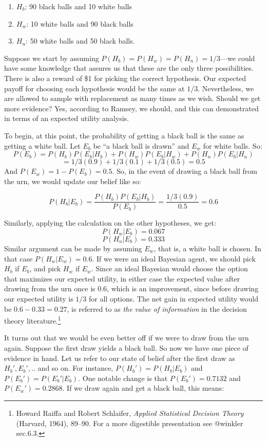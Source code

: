\begin{enumerate}
\def\labelenumi{\arabic{enumi}.}
\tightlist
\item
  \(H_b\): 90 black balls and 10 white balls
\item
  \(H_w\): 10 white balls and 90 black balls
\item
  \(H_n\): 50 white balls and 50 black balls.
\end{enumerate}

Suppose we start by assuming \(P(H_b) = P(H_w) = P(H_n) = 1/3\)---we
could have some knowledge that assures us that these are the only three
possibilities. There is also a reward of \$1 for picking the correct
hypothesis. Our expected payoff for choosing each hypothesis would be
the same at \(1/3\). Nevertheless, we are allowed to sample with
replacement as many times as we wish. Should we get more evidence? Yes,
according to Ramsey, we should, and this can demonstrated in terms of an
expected utility analysis.

To begin, at this point, the probability of getting a black ball is the
same as getting a white ball. Let \(E_b\) be ``a black ball is drawn''
and \(E_w\) for white balls. So:
\[P(E_b) = P(H_b)P(E_b|H_b) + P(H_w)P(E_b|H_w) + P(H_n)P(E_b|H_n)\]
\[=1/3(0.9)+1/3(0.1)+1/3(0.5)=0.5\] And \(P(E_w) = 1 - P(E_b) = 0.5\).
So, in the event of drawing a black ball from the urn, we would update
our belief like so:

\[P(H_b|E_b) = \frac{P(H_b)P(E_b|H_b)}{P(E_b)}=\frac{1/3(0.9)}{0.5} = 0.6 \]

Similarly, applying the calculation on the other hypotheses, we get:
\[P(H_w|E_b) = 0.067\] \[P(H_n|E_b) = 0.333\] Similar argument can be
made by assuming \(E_w\), that is, a white ball is chosen. In that case
\(P(H_w|E_w) = 0.6\). If we were an ideal Bayesian agent, we should pick
\(H_b\) if \(E_b\), and pick \(H_w\) if \(E_w\). Since an ideal Bayesian
would choose the option that maximizes our expected utility, in either
case the expected value after drawing from the urn once is \(0.6\),
which is an improvement, since before drawing our expected utility is
\(1/3\) for all options. The net gain in expected utility would be
\(0.6 - 0.33 = 0.27\), is referred to as \emph{the value of information}
in the decision theory literature.\footnote{Howard Raiffa and Robert
  Schlaifer, \emph{Applied Statistical Decision Theory} (Harvard, 1964),
  89--90. For a more digestible presentation see @winkler sec.6.3.}

It turns out that we would be even better off if we were to draw from
the urn again. Suppose the first draw yields a black ball. So now we
have one piece of evidence in hand. Let us refer to our state of belief
after the first draw as \(H_b', E_b',..\) and so on. For instance,
\(P(H_b') = P(H_b|E_b)\) and \(P(E_b') = P(E_b'|E_b)\). One notable
change is that \(P(E_b') = 0.7132\) and \(P(E_w')=0.2868\). If we draw
again and get a black ball, this means:

